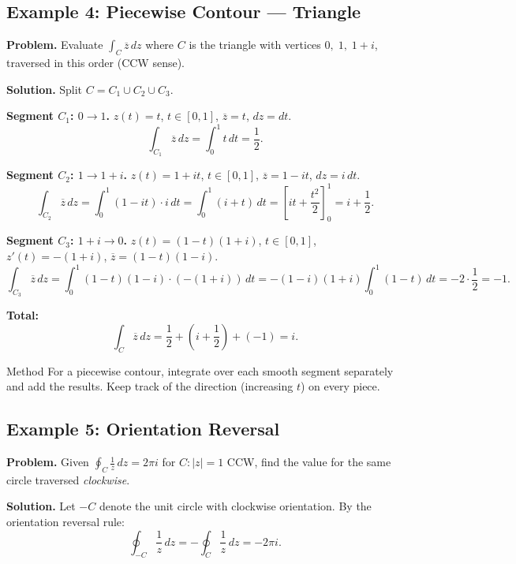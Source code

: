 \documentclass[12pt,a4paper]{article}
\begin{document}
\subsection*{Example 4: Piecewise Contour --- Triangle}

\textbf{Problem.} Evaluate $\displaystyle\int_C \overline{z}\,dz$ where $C$ is
the triangle with vertices $0,\;1,\;1+i$, traversed in this order (CCW sense).

\textbf{Solution.} Split $C = C_1 \cup C_2 \cup C_3$.

\medskip
\textbf{Segment $C_1$: $0 \to 1$.}
$z(t)=t$, $t\in[0,1]$, $\overline{z}=t$, $dz=dt$.
\[\int_{C_1}\overline{z}\,dz = \int_0^1 t\,dt = \frac{1}{2}.\]

\textbf{Segment $C_2$: $1 \to 1+i$.}
$z(t)=1+it$, $t\in[0,1]$, $\overline{z}=1-it$, $dz=i\,dt$.
\[\int_{C_2}\overline{z}\,dz = \int_0^1 (1-it)\cdot i\,dt = \int_0^1(i+t)\,dt
= \left[it+\frac{t^2}{2}\right]_0^1 = i+\frac{1}{2}.\]

\textbf{Segment $C_3$: $1+i \to 0$.}
$z(t)=(1-t)(1+i)$, $t\in[0,1]$, $z'(t)=-(1+i)$,
$\overline{z}=(1-t)(1-i)$.
\[\int_{C_3}\overline{z}\,dz = \int_0^1 (1-t)(1-i)\cdot(-(1+i))\,dt
= -(1-i)(1+i)\int_0^1(1-t)\,dt = -2\cdot\frac{1}{2} = -1.\]

\textbf{Total:}
\[\int_C \overline{z}\,dz = \frac{1}{2} + \left(i+\frac{1}{2}\right) + (-1) = i.\]

\begin{learnbox}{Method}
For a piecewise contour, integrate over each smooth segment separately and add
the results. Keep track of the direction (increasing $t$) on every piece.
\end{learnbox}

\subsection*{Example 5: Orientation Reversal}

\textbf{Problem.} Given $\displaystyle\oint_C \frac{1}{z}\,dz = 2\pi i$ for $C: |z|=1$ CCW,
find the value for the same circle traversed \emph{clockwise}.

\textbf{Solution.} Let $-C$ denote the unit circle with clockwise orientation.
By the orientation reversal rule:
\[
  \oint_{-C}\frac{1}{z}\,dz = -\oint_C\frac{1}{z}\,dz = -2\pi i.
\]
\end{document}
